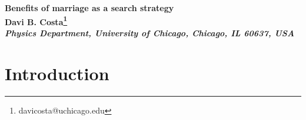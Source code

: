 \documentclass[12pt]{article}
\begin{document}
\baselineskip=18pt \pagestyle{plain} \setcounter{page}{1}


\begin{center}

{\Large \bf Benefits of marriage as a search strategy} \\ [9mm]



{\normalsize \bf Davi B. Costa\footnote[2]{davicosta@uchicago.edu} \\ [3mm]
{\small \it Physics Department, University of Chicago, Chicago, IL 60637, USA}}


\end{center}

\vspace*{0.2cm}


\begin{abstract}
We propose and study an agent-based model of marriage. Agents have preferences that are determined by a probability distribution. They search for better mates through a stochastic matching process, forming new couples and splitting up in the process. Marriage corresponds to the behavior of stopping searching for a better mate when the affinity between a couple exceeds a certain value. We show that the average utility in the system with marriage can be higher than in the system without it. Part of our results can be summarized in what sounds to be good advice: don’t marry the first person you like or search for the love of your life, but get married if you like your partner more than a sigma above average. To test the adequacy of our model to describe real societies, we compare the evolution of the fraction of married couples to real-world data and obtain good agreement.
\end{abstract}



\newpage


\newpage
\section{Introduction}
\end{document}
